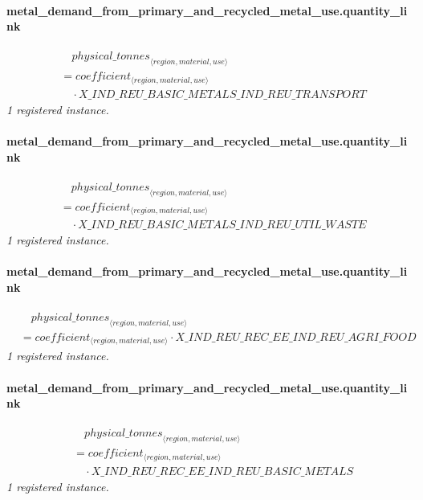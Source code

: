 \documentclass[11pt]{article}
\begin{document}
\paragraph{metal\_demand\_from\_primary\_and\_recycled\_metal\_use.quantity\_link}
\begin{align*}
&\quad {physical\_tonnes}_{\langle region, material, use\rangle}\\
&= coefficient_{\langle region, material, use\rangle}\\
&\quad {}\cdot X\_IND\_REU\_BASIC\_METALS\_IND\_REU\_TRANSPORT
\end{align*}
\noindent\emph{1 registered instance.}\par
\paragraph{metal\_demand\_from\_primary\_and\_recycled\_metal\_use.quantity\_link}
\begin{align*}
&\quad {physical\_tonnes}_{\langle region, material, use\rangle}\\
&= coefficient_{\langle region, material, use\rangle}\\
&\quad {}\cdot X\_IND\_REU\_BASIC\_METALS\_IND\_REU\_UTIL\_WASTE
\end{align*}
\noindent\emph{1 registered instance.}\par
\paragraph{metal\_demand\_from\_primary\_and\_recycled\_metal\_use.quantity\_link}
\begin{align*}
&\quad {physical\_tonnes}_{\langle region, material, use\rangle}\\
&= coefficient_{\langle region, material, use\rangle} \cdot X\_IND\_REU\_REC\_EE\_IND\_REU\_AGRI\_FOOD
\end{align*}
\noindent\emph{1 registered instance.}\par
\paragraph{metal\_demand\_from\_primary\_and\_recycled\_metal\_use.quantity\_link}
\begin{align*}
&\quad {physical\_tonnes}_{\langle region, material, use\rangle}\\
&= coefficient_{\langle region, material, use\rangle}\\
&\quad {}\cdot X\_IND\_REU\_REC\_EE\_IND\_REU\_BASIC\_METALS
\end{align*}
\noindent\emph{1 registered instance.}\par
\end{document}
